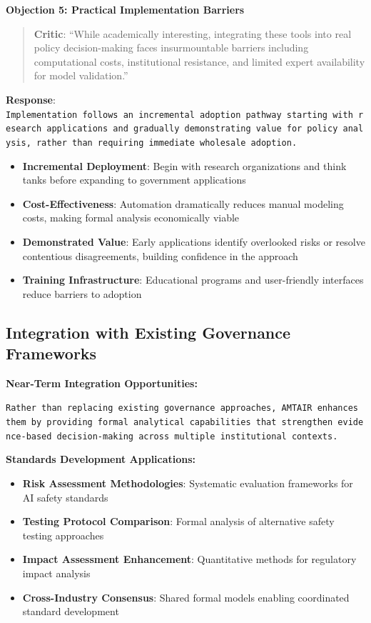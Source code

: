 \documentclass[
  11pt,
  letterpaper,
]{book}
\providecommand{\tightlist}{%
  \setlength{\itemsep}{0pt}\setlength{\parskip}{0pt}}
\begin{document}
\textbf{Objection 5: Practical Implementation Barriers}

\begin{quote}
\textbf{Critic}: ``While academically interesting, integrating these
tools into real policy decision-making faces insurmountable barriers
including computational costs, institutional resistance, and limited
expert availability for model validation.''
\end{quote}

\textbf{Response}:
\texttt{Implementation\ follows\ an\ incremental\ adoption\ pathway\ starting\ with\ research\ applications\ and\ gradually\ demonstrating\ value\ for\ policy\ analysis,\ rather\ than\ requiring\ immediate\ wholesale\ adoption.}

\begin{itemize}
\tightlist
\item
  \textbf{Incremental Deployment}: Begin with research organizations and
  think tanks before expanding to government applications
\item
  \textbf{Cost-Effectiveness}: Automation dramatically reduces manual
  modeling costs, making formal analysis economically viable
\item
  \textbf{Demonstrated Value}: Early applications identify overlooked
  risks or resolve contentious disagreements, building confidence in the
  approach
\item
  \textbf{Training Infrastructure}: Educational programs and
  user-friendly interfaces reduce barriers to adoption
\end{itemize}

\subsection{Integration with Existing Governance
Frameworks}\label{sec-framework-integration}

\textbf{Near-Term Integration Opportunities:}

\texttt{Rather\ than\ replacing\ existing\ governance\ approaches,\ AMTAIR\ enhances\ them\ by\ providing\ formal\ analytical\ capabilities\ that\ strengthen\ evidence-based\ decision-making\ across\ multiple\ institutional\ contexts.}

\textbf{Standards Development Applications:}

\begin{itemize}
\tightlist
\item
  \textbf{Risk Assessment Methodologies}: Systematic evaluation
  frameworks for AI safety standards
\item
  \textbf{Testing Protocol Comparison}: Formal analysis of alternative
  safety testing approaches
\item
  \textbf{Impact Assessment Enhancement}: Quantitative methods for
  regulatory impact analysis
\item
  \textbf{Cross-Industry Consensus}: Shared formal models enabling
  coordinated standard development
\end{itemize}
\end{document}
